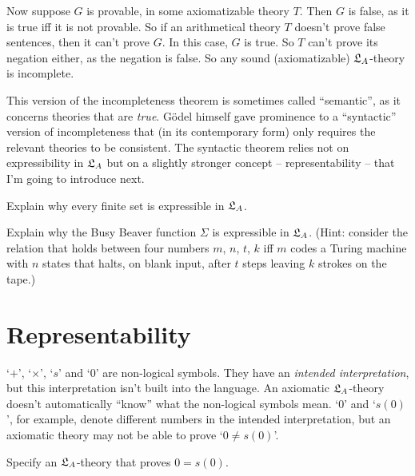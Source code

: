 Now suppose $G$ is provable,
in some axiomatizable theory $T$.
Then $G$ is false,
as it is true iff it is not provable.
So if an arithmetical theory $T$ doesn't prove false sentences,
then it can't prove $G$.
In this case,
$G$ is true.
So $T$ can't prove its negation either,
as the negation is false.
So any sound (axiomatizable) $\mathfrak{L}_{A}$-theory is incomplete.

\fi

This version of the incompleteness theorem is sometimes called ``semantic'',
as it concerns theories that are \emph{true}.
Gödel himself gave prominence to a ``syntactic'' version of incompleteness
that (in its contemporary form) only requires the relevant theories to be consistent.
The syntactic theorem relies not on expressibility in $\mathfrak{L}_{A}$
but on a slightly stronger concept -- representability -- that I'm going to introduce next.

\begin{exercise}
  Explain why every finite set is expressible in $\mathfrak{L}_{A}$.
\end{exercise}

\begin{exercise}
  Explain why the Busy Beaver function $\Sigma$ is expressible in $\mathfrak{L}_{A}$.
  (Hint: consider the relation that holds between
  four numbers $m$, $n$, $t$, $k$ iff $m$ codes a Turing machine with $n$ states
  that halts, on blank input, after $t$ steps leaving $k$ strokes on the tape.)
\end{exercise}


\section{Representability}\label{sec:representability}

`$+$', `$\times$', `$s$' and `0' are non-logical symbols.
They have an \emph{intended interpretation},
but this interpretation isn't built into the language.
An axiomatic $\mathfrak{L}_{A}$-theory doesn't automatically ``know'' what the non-logical symbols mean.
`$0$' and `$s(0)$',
for example,
denote different numbers in the intended interpretation,
but an axiomatic theory may not be able to prove `$0 \ne s(0)$'.

\begin{exercise}
  Specify an $\mathfrak{L}_A$-theory that proves $0 = s(0)$.
\end{exercise}

